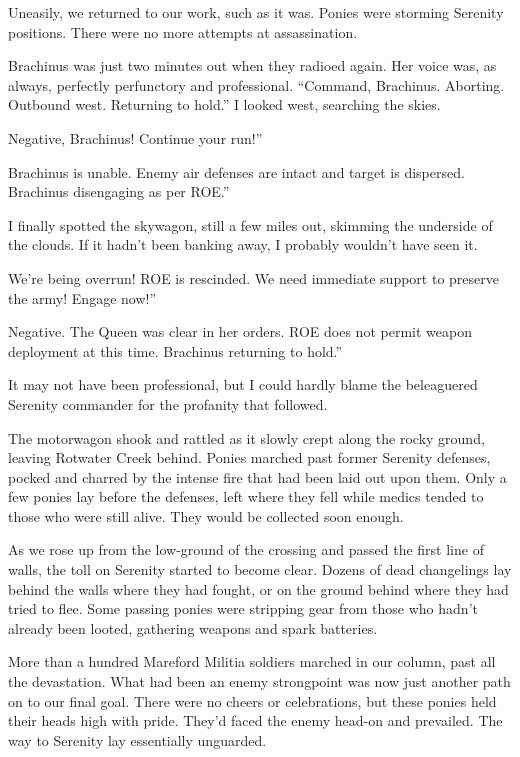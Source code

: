 Uneasily, we returned to our work, such as it was. Ponies were storming Serenity positions. There were no more attempts at assassination.

Brachinus was just two minutes out when they radioed again. Her voice was, as always, perfectly perfunctory and professional. “Command, Brachinus. Aborting. Outbound west. Returning to hold.” I looked west, searching the skies.

\leavevmode{}Negative, Brachinus! Continue your run!”

\leavevmode{}Brachinus is unable. Enemy air defenses are intact and target is dispersed. Brachinus disengaging as per ROE.”

I finally spotted the skywagon, still a few miles out, skimming the underside of the clouds. If it hadn’t been banking away, I probably wouldn’t have seen it.

\leavevmode{}We’re being overrun! ROE is rescinded. We need immediate support to preserve the army! Engage now!”

\leavevmode{}Negative. The Queen was clear in her orders. ROE does not permit weapon deployment at this time. Brachinus returning to hold.”

It may not have been professional, but I could hardly blame the beleaguered Serenity commander for the profanity that followed.

{\br}%
The motorwagon shook and rattled as it slowly crept along the rocky ground, leaving Rotwater Creek behind. Ponies marched past former Serenity defenses, pocked and charred by the intense fire that had been laid out upon them. Only a few ponies lay before the defenses, left where they fell while medics tended to those who were still alive. They would be collected soon enough.

As we rose up from the low-ground of the crossing and passed the first line of walls, the toll on Serenity started to become clear. Dozens of dead changelings lay behind the walls where they had fought, or on the ground behind where they had tried to flee. Some passing ponies were stripping gear from those who hadn’t already been looted, gathering weapons and spark batteries.

More than a hundred Mareford Militia soldiers marched in our column, past all the devastation. What had been an enemy strongpoint was now just another path on to our final goal. There were no cheers or celebrations, but these ponies held their heads high with pride. They’d faced the enemy head-on and prevailed. The way to Serenity lay essentially unguarded.

